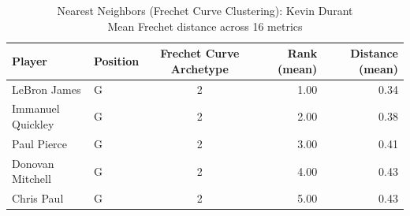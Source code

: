 \begin{table}[t]
\caption*{
{\fontsize{20}{25} Nearest Neighbors (Frechet Curve Clustering): Kevin Durant\fontsize{12}{15}\selectfont } \\ 
{\fontsize{14}{17}\selectfont  Mean Frechet distance across 16 metrics\fontsize{12}{15}\selectfont }
} 
\fontsize{12.0pt}{14.0pt}\selectfont
\begin{tabular*}{\linewidth}{@{\extracolsep{\fill}}llcrr}
\toprule
Player & Position & Frechet Curve Archetype & Rank (mean) & Distance (mean) \\ 
\midrule\addlinespace[2.5pt]
LeBron James & G & 2 & 1.00 & 0.34 \\ 
Immanuel Quickley & G & 2 & 2.00 & 0.38 \\ 
Paul Pierce & G & 2 & 3.00 & 0.41 \\ 
Donovan Mitchell & G & 2 & 4.00 & 0.43 \\ 
Chris Paul & G & 2 & 5.00 & 0.43 \\ 
\bottomrule
\end{tabular*}
\end{table}

